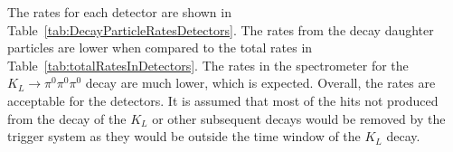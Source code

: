 \documentclass[../../main.tex]{subfiles}
\begin{document}
    The rates for each detector are shown in Table~\ref{tab:DecayParticleRatesDetectors}. The rates from the decay daughter particles are lower when compared to the total rates in Table~\ref{tab:totalRatesInDetectors}. The rates in the spectrometer for the $ K_L \to \pi^{0} \pi^{0} \pi^{0}$ decay are much lower, which is expected. Overall, the rates are acceptable for the detectors. It is assumed that most of the 
    hits not produced from the decay of the $K_L$ or other subsequent decays would be removed by the trigger system as they would be outside the time window of the $K_L$ decay.

    \begin{table}[htbp]
        \centering
\end{table}
\end{document}
